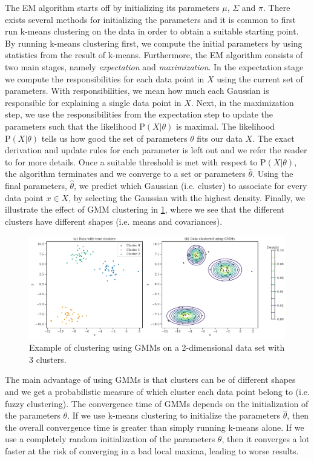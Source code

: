 The EM algorithm starts off by initializing its parameters $\mu$, $\Sigma$ and $\pi$. There exists several methods for initializing the parameters and it is common to first run k-means clustering on the data in order to obtain a suitable starting point. By running k-means clustering first, we compute the initial parameters by using statistics from the result of k-means. Furthermore, the EM algorithm consists of two main stages, namely \textit{expectation} and \textit{maximization}. In the expectation stage we compute the responsibilities for each data point in $X$ using the current set of parameters. With responsibilities, we mean how much each Gaussian is responsible for explaining a single data point in $X$. Next, in the maximization step, we use the responsibilities from the expectation step to update the parameters such that the likelihood $\text{P}(X | \theta)$ is maximal. The likelihood $\text{P}(X | \theta)$ tells us how good the set of parameters $\theta$ fits our data $X$. The exact derivation and update rules for each parameter is left out and we refer the reader to \cite[Section 9.4]{bishop2006} for more details. Once a suitable threshold is met with respect to $\text{P}(X | \theta)$, the algorithm terminates and we converge to a set or parameters $\hat{\theta}$. Using the final parameters, $\hat{\theta}$, we predict which Gaussian (i.e. cluster) to associate for every data point $x \in X$, by selecting the Gaussian with the highest density. Finally, we illustrate the effect of GMM clustering in \cref{fig:k-gmm-clustering-2d-example}, where we see that the different clusters have different shapes (i.e. means and covariances).
\begin{figure}[H]
    \centering
    \includegraphics[width=\textwidth]{thesis/figures/k-gmm-clustering-2d-example.pdf}
    \caption{Example of clustering using GMMs on a 2-dimensional data set with 3 clusters.}
    \label{fig:k-gmm-clustering-2d-example}
\end{figure}

The main advantage of using GMMs is that clusters can be of different shapes and we get a probabilistic measure of which cluster each data point belong to (i.e. fuzzy clustering). The convergence time of GMMs depends on the initialization of the parameters $\theta$. If we use k-means clustering to initialize the parameters $\hat{\theta}$, then the overall convergence time is greater than simply running k-means alone. If we use a completely random initialization of the parameters $\theta$, then it converges a lot faster at the risk of converging in a bad local maxima, leading to worse results.

